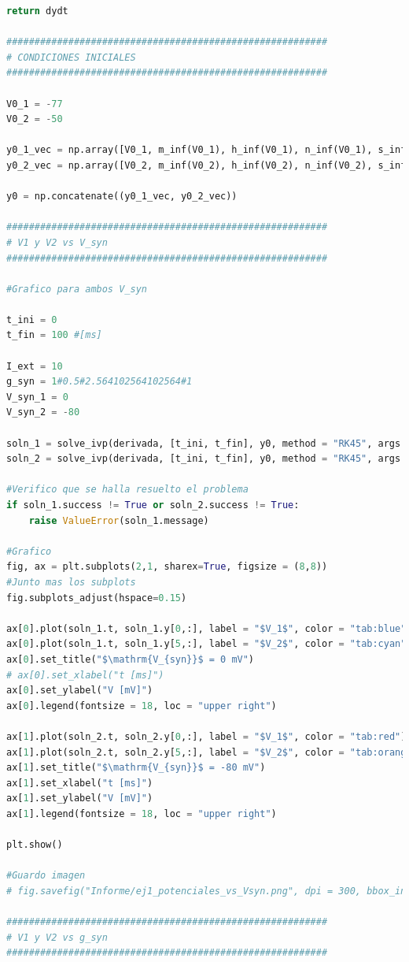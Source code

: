 \documentclass[aps,prb,twocolumn,superscriptaddress,floatfix,longbibliography]{revtex4-2}
\newcounter{para}
\begin{document}
\begin{lstlisting}[language=Python]
    return dydt

#########################################################
# CONDICIONES INICIALES
#########################################################

V0_1 = -77
V0_2 = -50

y0_1_vec = np.array([V0_1, m_inf(V0_1), h_inf(V0_1), n_inf(V0_1), s_inf(V0_1)])
y0_2_vec = np.array([V0_2, m_inf(V0_2), h_inf(V0_2), n_inf(V0_2), s_inf(V0_2)])

y0 = np.concatenate((y0_1_vec, y0_2_vec))

#########################################################
# V1 y V2 vs V_syn
#########################################################

#Grafico para ambos V_syn

t_ini = 0
t_fin = 100 #[ms]

I_ext = 10
g_syn = 1#0.5#2.564102564102564#1
V_syn_1 = 0
V_syn_2 = -80

soln_1 = solve_ivp(derivada, [t_ini, t_fin], y0, method = "RK45", args = (I_ext,g_syn,V_syn_1), dense_output = True)
soln_2 = solve_ivp(derivada, [t_ini, t_fin], y0, method = "RK45", args = (I_ext,g_syn,V_syn_2), dense_output = True)

#Verifico que se halla resuelto el problema
if soln_1.success != True or soln_2.success != True:
    raise ValueError(soln_1.message)

#Grafico
fig, ax = plt.subplots(2,1, sharex=True, figsize = (8,8))
#Junto mas los subplots
fig.subplots_adjust(hspace=0.15)

ax[0].plot(soln_1.t, soln_1.y[0,:], label = "$V_1$", color = "tab:blue")
ax[0].plot(soln_1.t, soln_1.y[5,:], label = "$V_2$", color = "tab:cyan")
ax[0].set_title("$\mathrm{V_{syn}}$ = 0 mV")
# ax[0].set_xlabel("t [ms]")
ax[0].set_ylabel("V [mV]")
ax[0].legend(fontsize = 18, loc = "upper right")

ax[1].plot(soln_2.t, soln_2.y[0,:], label = "$V_1$", color = "tab:red")
ax[1].plot(soln_2.t, soln_2.y[5,:], label = "$V_2$", color = "tab:orange")
ax[1].set_title("$\mathrm{V_{syn}}$ = -80 mV")
ax[1].set_xlabel("t [ms]")
ax[1].set_ylabel("V [mV]")
ax[1].legend(fontsize = 18, loc = "upper right")

plt.show()

#Guardo imagen
# fig.savefig("Informe/ej1_potenciales_vs_Vsyn.png", dpi = 300, bbox_inches = "tight")

#########################################################
# V1 y V2 vs g_syn
#########################################################


\end{lstlisting}
\end{document}
